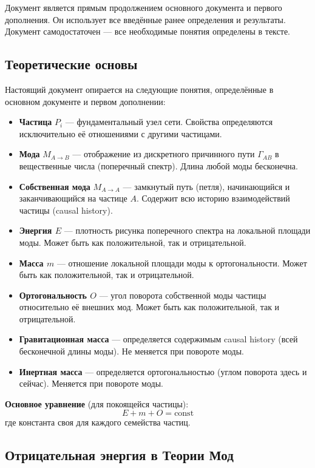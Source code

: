 \documentclass[12pt,a4paper]{article}
\begin{document}
Документ является прямым продолжением основного документа и первого дополнения. Он использует все введённые ранее определения и результаты. Документ самодостаточен --- все необходимые понятия определены в тексте.

\subsection{Теоретические основы}
Настоящий документ опирается на следующие понятия, определённые в основном документе и первом дополнении:

\begin{itemize}
    \item \textbf{Частица} $P_i$ --- фундаментальный узел сети. Свойства определяются исключительно её отношениями с другими частицами.
    \item \textbf{Мода} $M_{A \to B}$ --- отображение из дискретного причинного пути $\Gamma_{AB}$ в вещественные числа (поперечный спектр). Длина любой моды бесконечна.
    \item \textbf{Собственная мода} $M_{A \to A}$ --- замкнутый путь (петля), начинающийся и заканчивающийся на частице $A$. Содержит всю историю взаимодействий частицы (causal history).
    \item \textbf{Энергия $E$} --- плотность рисунка поперечного спектра на локальной площади моды. Может быть как положительной, так и отрицательной.
    \item \textbf{Масса $m$} --- отношение локальной площади моды к ортогональности. Может быть как положительной, так и отрицательной.
    \item \textbf{Ортогональность $O$} --- угол поворота собственной моды частицы относительно её внешних мод. Может быть как положительной, так и отрицательной.
    \item \textbf{Гравитационная масса} --- определяется содержимым causal history (всей бесконечной длины моды). Не меняется при повороте моды.
    \item \textbf{Инертная масса} --- определяется ортогональностью (углом поворота здесь и сейчас). Меняется при повороте моды.
\end{itemize}

\textbf{Основное уравнение} (для покоящейся частицы):
\begin{equation}
    E + m + O = \text{const}
    \label{eq:sum2}
\end{equation}
где константа своя для каждого семейства частиц.

\subsection{Отрицательная энергия в Теории Мод}
\end{document}

